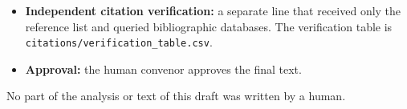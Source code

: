 \documentclass[12pt]{article}
\theoremstyle{remark}
\begin{document}
\begin{itemize}[itemsep=1pt]
\item \textbf{Independent citation verification:} a separate line that received only the reference list and queried bibliographic databases. The verification table is \texttt{citations/verification\_table.csv}.
\item \textbf{Approval:} the human convenor approves the final text.
\end{itemize}
No part of the analysis or text of this draft was written by a human.



\end{document}
